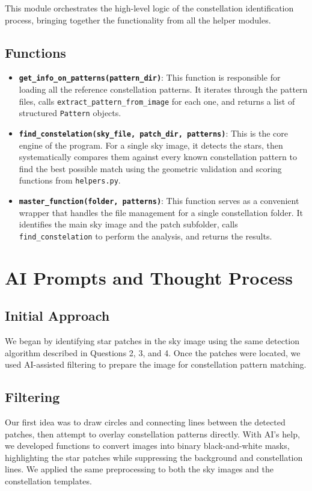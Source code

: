 \documentclass[a4paper,11pt]{article}
\begin{document}
This module orchestrates the high-level logic of the constellation identification process, bringing together the functionality from all the helper modules.

\subsection*{Functions}
\begin{itemize}
	\item \textbf{\texttt{get\_info\_on\_patterns(pattern\_dir)}}: This function is responsible for loading all the reference constellation patterns. It iterates through the pattern files, calls \texttt{extract\_pattern\_from\_image} for each one, and returns a list of structured \texttt{Pattern} objects.
	\item \textbf{\texttt{find\_constelation(sky\_file, patch\_dir, patterns)}}: This is the core engine of the program. For a single sky image, it detects the stars, then systematically compares them against every known constellation pattern to find the best possible match using the geometric validation and scoring functions from \texttt{helpers.py}.
	\item \textbf{\texttt{master\_function(folder, patterns)}}: This function serves as a convenient wrapper that handles the file management for a single constellation folder. It identifies the main sky image and the patch subfolder, calls \texttt{find\_constelation} to perform the analysis, and returns the results.
\end{itemize}


\section{AI Prompts and Thought Process}

\subsection{Initial Approach}
We began by identifying star patches in the sky image using the same detection algorithm described in Questions 2, 3, and 4. Once the patches were located, we used AI-assisted filtering to prepare the image for constellation pattern matching.

\subsection{Filtering}
Our first idea was to draw circles and connecting lines between the detected patches, then attempt to overlay constellation patterns directly. With AI’s help, we developed functions to convert images into binary black-and-white masks, highlighting the star patches while suppressing the background and constellation lines. We applied the same preprocessing to both the sky images and the constellation templates.
\end{document}
